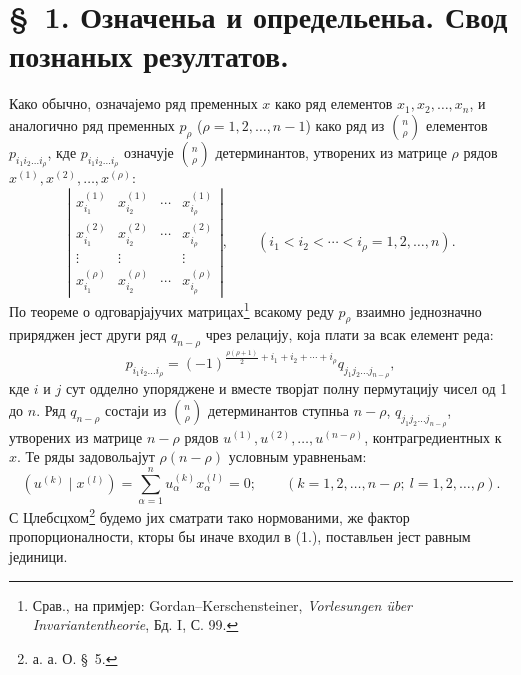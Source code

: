 ﻿\documentclass[11pt]{article}
\begin{document}
\section*{\S\ 1. Означеньа и определьеньа. Свод познаных резултатов.}

Како обычно, означајемо ряд пременных $x$ како ряд елементов $x_1,x_2,\ldots,x_n$, и аналогично ряд пременных $p_\rho$ ($\rho=1,2,\ldots,n-1$) како ряд из $\binom n\rho$ елементов $p_{i_1i_2\ldots i_\rho}$, кде $p_{i_1i_2\ldots i_\rho}$ означује $\binom n\rho$ детерминантов, утворених из матрице $\rho$ рядов $x^{(1)},x^{(2)},\ldots,x^{(\rho)}$:
\[
\left|\begin{array}{cccc}
 x_{i_1}^{(1)}&x_{i_2}^{(1)}&\cdots&x_{i_\rho}^{(1)}\\
 x_{i_1}^{(2)}&x_{i_2}^{(2)}&\cdots&x_{i_\rho}^{(2)}\\
 \vdots&\vdots&&\vdots\\
 x_{i_1}^{(\rho)}&x_{i_2}^{(\rho)}&\cdots&x_{i_\rho}^{(\rho)}
\end{array}\right|,
\qquad (i_1<i_2<\cdots<i_\rho=1,2,\ldots,n).
\]
По теореме о одговарјајучих матрицах\footnote{Срав., на примјер: Gordan--Kerschensteiner, \emph{Vorlesungen über Invariantentheorie}, Бд. I, С. 99.} всакому реду $p_\rho$ взаимно једнозначно приряджен јест други ряд $q_{n-\rho}$ чрез релацију, која плати за всак елемент реда:
\begin{equation}
 p_{i_1i_2\ldots i_\rho}=(-1)^{\frac{\rho(\rho+1)}{2}+i_1+i_2+\cdots+i_\rho}q_{j_1j_2\ldots j_{n-\rho}},
\tag{1}
\end{equation}
кде $i$ и $j$ сут одделно упоряджене и вместе творјат полну пермутацију чисел од 1 до $n$. Ряд $q_{n-\rho}$ состаји из $\binom n\rho$ детерминантов ступньа $n-\rho$, $q_{j_1j_2\ldots j_{n-\rho}}$, утворених из матрице $n-\rho$ рядов $u^{(1)},u^{(2)},\ldots,u^{(n-\rho)}$, контрагредиентных к $x$. Те ряды задовольајут $\rho(n-\rho)$ условным уравненьам:
\begin{equation}
 (u^{(k)}\mid x^{(l)})=\sum_{\alpha=1}^{n}u_\alpha^{(k)}x_\alpha^{(l)}=0;
 \qquad (k=1,2,\ldots,n-\rho;\ l=1,2,\ldots,\rho).
\tag{2}
\end{equation}
С Цлебсцхом\footnote{а. а. О. \S\ 5.} будемо јих сматрати тако нормованими, же фактор пропорционалности, кторы бы иначе входил в (1.), поставльен јест равным јединици.
\end{document}
